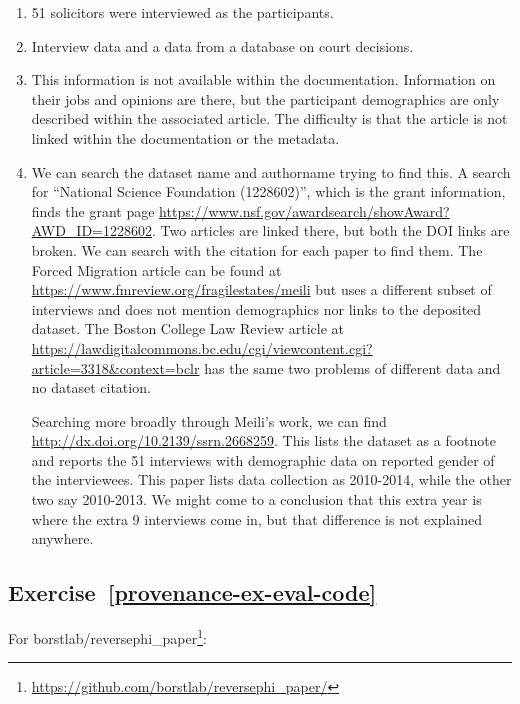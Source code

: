 \documentclass[
]{krantz}
\renewcommand{\href}[2]{#2\footnote{\url{#1}}}
\begin{document}
\begin{enumerate}
\def\labelenumi{\arabic{enumi}.}
\item
  51 solicitors were interviewed as the participants.
\item
  Interview data and a data from a database on court decisions.
\item
  This information is not available within the documentation.
  Information on their jobs and opinions are there,
  but the participant demographics are only described within the associated article.
  The difficulty is that the article is not linked within the documentation or the metadata.
\item
  We can search the dataset name and authorname trying to find this.
  A search for ``National Science Foundation (1228602)'',
  which is the grant information,
  finds the grant page \url{https://www.nsf.gov/awardsearch/showAward?AWD_ID=1228602}.
  Two articles are linked there,
  but both the DOI links are broken.
  We can search with the citation for each paper to find them.
  The Forced Migration article can be found at \url{https://www.fmreview.org/fragilestates/meili}
  but uses a different subset of interviews and does not mention demographics nor links to the deposited dataset.
  The Boston College Law Review article at \url{https://lawdigitalcommons.bc.edu/cgi/viewcontent.cgi?article=3318\&context=bclr}
  has the same two problems of different data and no dataset citation.

  Searching more broadly through Meili's work, we can find \url{http://dx.doi.org/10.2139/ssrn.2668259}.
  This lists the dataset as a footnote and reports the 51 interviews with demographic data on reported gender of the interviewees.
  This paper lists data collection as 2010-2014,
  while the other two say 2010-2013.
  We might come to a conclusion that this extra year is where the extra 9 interviews come in,
  but that difference is not explained anywhere.
\end{enumerate}

\hypertarget{exercise-refprovenance-ex-eval-code}{%
\subsection*{Exercise~\ref{provenance-ex-eval-code}}\label{exercise-refprovenance-ex-eval-code}}


For \href{https://github.com/borstlab/reversephi_paper/}{borstlab/reversephi\_paper}:
\end{document}
